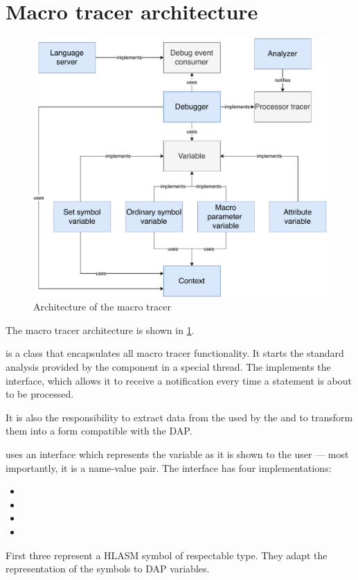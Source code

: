 \section{Macro tracer architecture}
\begin{figure}
	\centering
	\includegraphics[width=\textwidth]{img/macro_tracer_arch}
	\caption{Architecture of the macro tracer}
	\label{macro_tracer_arch}
\end{figure}

The macro tracer architecture is shown in \cref{macro_tracer_arch}.

 is a class that encapsulates all macro tracer functionality. It starts the standard analysis provided by the  component in a special thread. The  implements the  interface, which allows it to receive a notification every time a statement is about to be processed.

It is also the  responsibility to extract data from the  used by the  and to transform them into a form compatible with the DAP.

 uses an interface  which represents the variable as it is shown to the user --- most importantly, it is a name-value pair. The  interface has four implementations:
\begin{itemize}
	\item {}
	\item {}
	\item {}
	\item {}
\end{itemize}
First three represent a HLASM symbol of respectable type. They adapt the  representation of the symbols to DAP variables.

